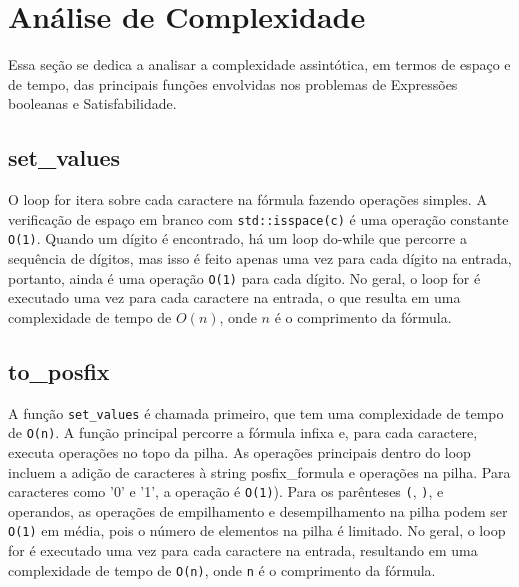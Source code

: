 \documentclass{article}
\begin{document}
\section{Análise de Complexidade}
Essa seção se dedica a analisar a complexidade assintótica, em termos de espaço e de tempo, das principais funções envolvidas nos problemas de Expressões booleanas e Satisfabilidade.


\subsection{set\_values}
O loop for itera sobre cada caractere na fórmula fazendo operações simples.
A verificação de espaço em branco com \texttt{std::isspace(c)} é uma operação constante \texttt{O(1)}.
Quando um dígito é encontrado, há um loop do-while que percorre a sequência de dígitos, mas isso é feito apenas uma vez para cada dígito na entrada, portanto, ainda é uma operação \texttt{O(1)} para cada dígito.
No geral, o loop for é executado uma vez para cada caractere na entrada, o que resulta em uma complexidade de tempo de $O(n)$, onde $n$ é o comprimento da fórmula.

\subsection{to\_posfix}
A função \texttt{set\_values} é chamada primeiro, que tem uma complexidade de tempo de \texttt{O(n)}.
A função principal percorre a fórmula infixa e, para cada caractere, executa operações no topo da pilha.
As operações principais dentro do loop incluem a adição de caracteres à string posfix\_formula e operações na pilha.
Para caracteres como '0' e '1', a operação é \texttt{O(1)}).
Para os parênteses \texttt{(}, \texttt{)}, e operandos, as operações de empilhamento e desempilhamento na pilha podem ser \texttt{O(1)} em média, pois o número de elementos na pilha é limitado.
No geral, o loop for é executado uma vez para cada caractere na entrada, resultando em uma complexidade de tempo de \texttt{O(n)}, onde \texttt{n} é o comprimento da fórmula.
\end{document}

